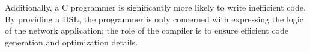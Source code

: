 Additionally, a C programmer is significantly more likely to write inefficient code. By providing a DSL, the programmer is only concerned with expressing the logic of the network application; the role of the compiler is to ensure efficient code generation and optimization details. 

%
%
%
%
%

